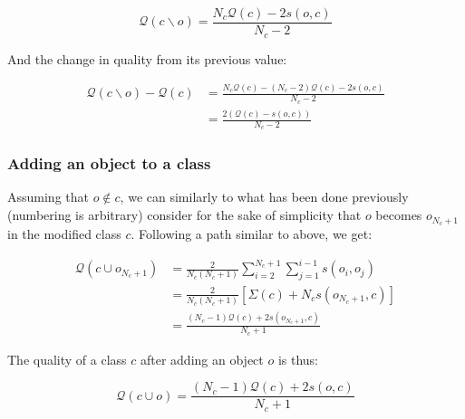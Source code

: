 \documentclass[natbib,smallextended]{svjour3}
\begin{document}
\begin{equation}
  \mathcal{Q}\left(c \smallsetminus o\right) = \frac{N_c \mathcal{Q}(c)  - 2s\left(o, c\right)}{N_c-2}
  \label{eq:newQual_remove}
\end{equation}

And the change in quality from its previous value:

\begin{equation} \label{deltaRemove}
  \begin{aligned}
    \mathcal{Q}\left(c \smallsetminus o\right) - \mathcal{Q}\left(c\right) & = \frac{N_c \mathcal{Q}(c)  - (N_c-2) \mathcal{Q}(c)  - 2s\left(o, c\right)}{N_c-2} \\
                                                                           & = \frac{2\left( \mathcal{Q}(c) - s\left(o, c\right)\right)}{N_c-2}
    \end{aligned}
\end{equation}


\subsubsection{Adding an object to a class}

Assuming that $o \notin c$, we can similarly to what has been done previously (numbering is arbitrary) consider for the sake of simplicity that $o$ becomes $o_{N_c+1}$ in the modified class $c$. Following a path similar to above, we get:

\begin{equation*}
  \begin{aligned}
    \mathcal{Q}(c \cup o_{N_c+1}) & = \frac{2}{N_c(N_c+1)} \sum_{i=2}^{N_c+1} \sum_{j=1}^{i-1} s\left(o_i, o_j\right) \\
                                & = \frac{2}{N_c(N_c+1)} \left[\Sigma(c) + N_c s\left(o_{N_c+1}, c\right)\right] \\
                                & = \frac{(N_c-1) \mathcal{Q}(c)  + 2s\left(o_{N_c+1}, c\right)}{N_c+1}
  \end{aligned}
\end{equation*}

\noindent The quality of a class $c$ after adding an object $o$ is thus:

\begin{equation}
  \mathcal{Q}\left(c \cup o\right) = \frac{(N_c-1) \mathcal{Q}(c)  + 2s\left(o, c\right)}{N_c+1}
  \label{eq:newQual_add}
\end{equation}
\end{document}
